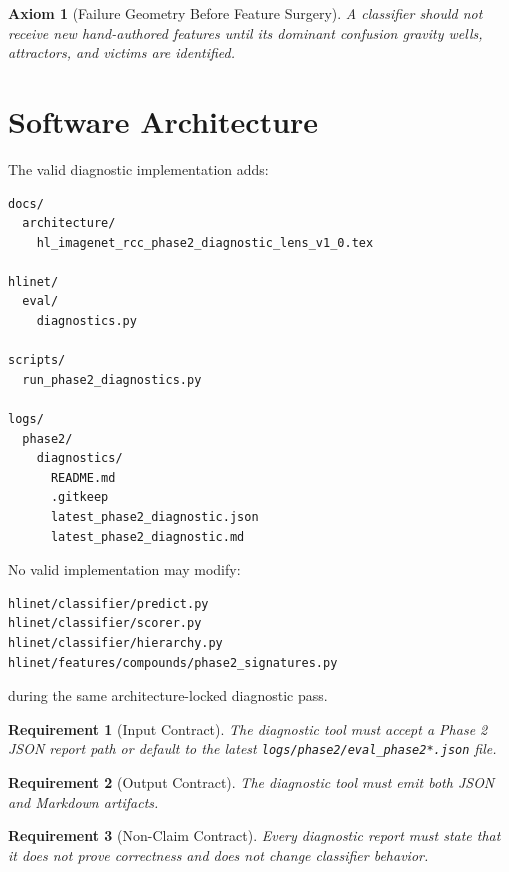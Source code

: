 \documentclass[12pt]{article}
\newtheorem{axiom}{Axiom}
\newtheorem{requirement}{Requirement}
\begin{document}
\begin{axiom}[Failure Geometry Before Feature Surgery]
A classifier should not receive new hand-authored features until its dominant
confusion gravity wells, attractors, and victims are identified.
\end{axiom}

\section{Software Architecture}

The valid diagnostic implementation adds:

\begin{lstlisting}
docs/
  architecture/
    hl_imagenet_rcc_phase2_diagnostic_lens_v1_0.tex

hlinet/
  eval/
    diagnostics.py

scripts/
  run_phase2_diagnostics.py

logs/
  phase2/
    diagnostics/
      README.md
      .gitkeep
      latest_phase2_diagnostic.json
      latest_phase2_diagnostic.md
\end{lstlisting}

No valid implementation may modify:

\begin{lstlisting}
hlinet/classifier/predict.py
hlinet/classifier/scorer.py
hlinet/classifier/hierarchy.py
hlinet/features/compounds/phase2_signatures.py
\end{lstlisting}

during the same architecture-locked diagnostic pass.

\begin{requirement}[Input Contract]
The diagnostic tool must accept a Phase 2 JSON report path or default to the
latest \texttt{logs/phase2/eval\_phase2*.json} file.
\end{requirement}

\begin{requirement}[Output Contract]
The diagnostic tool must emit both JSON and Markdown artifacts.
\end{requirement}

\begin{requirement}[Non-Claim Contract]
Every diagnostic report must state that it does not prove correctness and does
not change classifier behavior.
\end{requirement}
\end{document}
